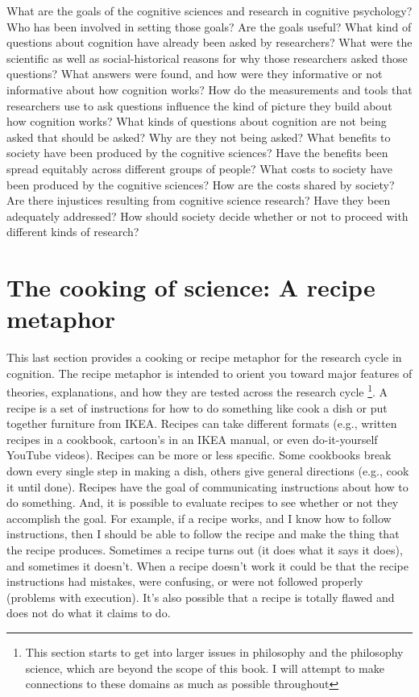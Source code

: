 \documentclass[
  oneside,
  12pt]{crumpbook}
\begin{document}
What are the goals of the cognitive sciences and research in cognitive psychology? Who has been involved in setting those goals? Are the goals useful? What kind of questions about cognition have already been asked by researchers? What were the scientific as well as social-historical reasons for why those researchers asked those questions? What answers were found, and how were they informative or not informative about how cognition works? How do the measurements and tools that researchers use to ask questions influence the kind of picture they build about how cognition works? What kinds of questions about cognition are not being asked that should be asked? Why are they not being asked? What benefits to society have been produced by the cognitive sciences? Have the benefits been spread equitably across different groups of people? What costs to society have been produced by the cognitive sciences? How are the costs shared by society? Are there injustices resulting from cognitive science research? Have they been adequately addressed? How should society decide whether or not to proceed with different kinds of research?

\hypertarget{the-cooking-of-science-a-recipe-metaphor}{%
\section{The cooking of science: A recipe metaphor}\label{the-cooking-of-science-a-recipe-metaphor}}

This last section provides a cooking or recipe metaphor for the research cycle in cognition. The recipe metaphor is intended to orient you toward major features of theories, explanations, and how they are tested across the research cycle \footnote{This section starts to get into larger issues in philosophy and the philosophy science, which are beyond the scope of this book. I will attempt to make connections to these domains as much as possible throughout}. A recipe is a set of instructions for how to do something like cook a dish or put together furniture from IKEA. Recipes can take different formats (e.g., written recipes in a cookbook, cartoon's in an IKEA manual, or even do-it-yourself YouTube videos). Recipes can be more or less specific. Some cookbooks break down every single step in making a dish, others give general directions (e.g., cook it until done). Recipes have the goal of communicating instructions about how to do something. And, it is possible to evaluate recipes to see whether or not they accomplish the goal. For example, if a recipe works, and I know how to follow instructions, then I should be able to follow the recipe and make the thing that the recipe produces. Sometimes a recipe turns out (it does what it says it does), and sometimes it doesn't. When a recipe doesn't work it could be that the recipe instructions had mistakes, were confusing, or were not followed properly (problems with execution). It's also possible that a recipe is totally flawed and does not do what it claims to do.
\end{document}
